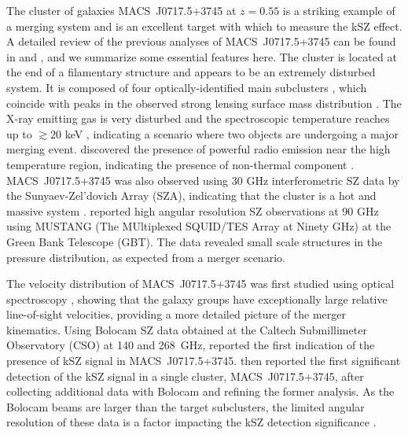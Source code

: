 \documentclass[twocolumn,traditabstract]{aa}
\begin{document}
The cluster of galaxies \mbox{MACS~J0717.5+3745} at $z=0.55$ is a striking example of a merging system and is an excellent target with which to measure the kSZ effect. A detailed review of the previous analyses of \mbox{MACS~J0717.5+3745} can be found in \cite{Mroczkowski2012} and \cite{Sayers2013}, and we summarize some essential features here. The cluster is located at the end of a filamentary structure \citep[e.g.,][]{Ebeling2004,Jauzac2012} and appears to be an extremely disturbed system. It is composed of four optically-identified main subclusters \citep{Ma2009}, which coincide with peaks in the observed strong lensing surface mass distribution \citep[see e.g.,][]{Zitrin2009,Diego2015,Limousin2015}. The X-ray emitting gas is very disturbed \citep[e.g.,][]{Ebeling2007,Ma2009} and the spectroscopic temperature reaches up to $\gtrsim 20$ keV \citep{Ma2009}, indicating a scenario where two objects are undergoing a major merging event. \cite{Edge2003} discovered the presence of powerful radio emission near the high temperature region, indicating the presence of non-thermal component \citep[see also, e.g.,][]{vanWeeren2009}. \mbox{MACS~J0717.5+3745} was also observed using 30 GHz interferometric SZ data by the Sunyaev-Zel'dovich Array (SZA), indicating that the cluster is a hot and massive system \citep{LaRoque2003}. \cite{Mroczkowski2012} reported high angular resolution SZ observations at 90 GHz using MUSTANG (The MUltiplexed SQUID/TES Array at Ninety GHz) at the Green Bank Telescope (GBT). The data revealed small scale structures in the pressure distribution, as expected from a merger scenario.

The velocity distribution of \mbox{MACS~J0717.5+3745} was first studied using optical spectroscopy \citep{Ma2009}, showing that the galaxy groups have exceptionally large relative line-of-sight velocities, providing a more detailed picture of the merger kinematics. Using Bolocam SZ data obtained at the Caltech Submillimeter Observatory (CSO) at 140 and 268~GHz, \cite{Mroczkowski2012} reported the first indication of the presence of kSZ signal in \mbox{MACS~J0717.5+3745}. \cite{Sayers2013} then reported the first significant detection of the kSZ signal in a single cluster, \mbox{MACS~J0717.5+3745}, after collecting additional data with Bolocam and refining the former analysis. As the Bolocam beams are larger than the target subclusters, the limited angular resolution of these data is a factor impacting the kSZ detection significance \citep[see][for more details]{Sayers2013}.
\end{document}
